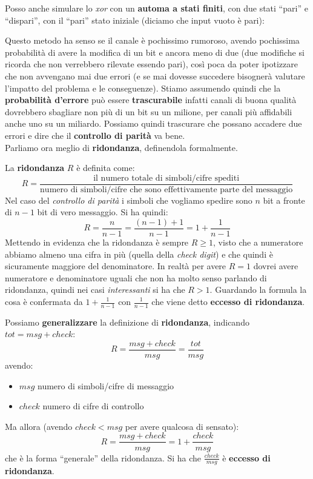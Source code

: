 \documentclass[a4paper,12pt, oneside]{book}
\begin{document}
Posso anche simulare lo \textit{xor} con un \textbf{automa a stati finiti}, con
due stati ``pari'' e ``dispari'', con il ``pari'' stato iniziale (diciamo che
input vuoto è pari):
\begin{center}
\end{center}
Questo metodo ha senso se il canale è pochissimo rumoroso, avendo pochissima
probabilità di avere la modifica di un bit e ancora meno di due (due modifiche
si ricorda che non verrebbero rilevate essendo pari), così poca da poter
ipotizzare che non avvengano mai due errori (e se mai dovesse succedere
bisognerà valutare l'impatto del problema e le conseguenze). Stiamo assumendo
quindi che la \textbf{probabilità d'errore} può essere \textbf{trascurabile}
infatti canali di buona qualità dovrebbero sbagliare non più di un bit su un
milione, per canali più affidabili anche uno su un miliardo. Possiamo quindi
trascurare che possano accadere due errori e dire che il \textbf{controllo di
  parità} va bene. \\
Parliamo ora meglio di \textbf{ridondanza}, definendola formalmente.
\begin{definizione}
  La \textbf{ridondanza} $R$ è definita come:
  \[R=\frac{\mbox{il numero totale di simboli/cifre spediti}}{\mbox{numero di
        simboli/cifre che sono effettivamente parte del messaggio}}\] 
  Nel caso del \emph{controllo di parità} i simboli che vogliamo spedire sono
  $n$ bit a fronte di $n-1$ bit di vero messaggio. Si ha quindi:
  \[R=\frac{n}{n-1}=\frac{(n-1)+1}{n-1}=1+\frac{1}{n-1}\]
  Mettendo in evidenza che la ridondanza è sempre $R\geq 1$, visto che a
  numeratore abbiamo almeno una cifra in più (quella della \emph{check digit}) e
  che quindi è sicuramente maggiore del denominatore. In realtà per avere $R=1$
  dovrei avere numeratore e denominatore uguali che non ha molto senso parlando
  di ridondanza, quindi nei casi \emph{interessanti} si ha che $R>1$. Guardando
  la formula la cosa è confermata da $1+\frac{1}{n-1}$ con $\frac{1}{n-1}$ che
  viene detto \textbf{eccesso di ridondanza}.
\end{definizione}
\begin{definizione}
  Possiamo \textbf{generalizzare} la definizione di \textbf{ridondanza},
  indicando $tot=msg+check$:
  \[R=\frac{msg+check}{msg}=\frac{tot}{msg}\]
  avendo:
  \begin{itemize}
    \item $msg$ numero di simboli/cifre di messaggio
    \item $check$ numero di cifre di controllo
  \end{itemize}
  Ma allora (avendo $check<msg$ per avere qualcosa di sensato):
  \[R=\frac{msg+check}{msg}=1+\frac{check}{msg}\]
  che è la forma ``generale'' della ridondanza. Si ha che $\frac{check}{msg}$ è
  \textbf{eccesso di ridondanza}. 
\end{definizione}
\end{document}
